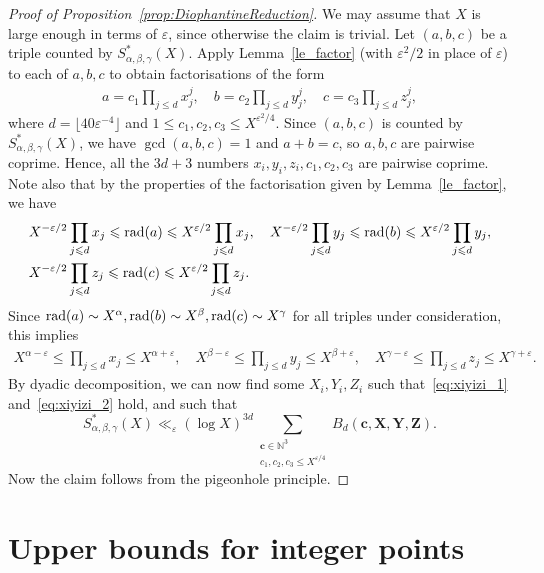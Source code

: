 \begin{proof}[Proof of Proposition~\ref{prop:DiophantineReduction}]
  We may assume that $X$ is large enough in terms of $\varepsilon$, since otherwise the claim is trivial. Let $(a,b,c)$ be a triple counted by $S^*_{\alpha,\beta,\gamma}(X)$. Apply Lemma~\ref{le_factor} (with $\varepsilon^2/2$ in place of $\varepsilon$) to each of $a,b,c$ to obtain factorisations of the form
\begin{align*}
a=c_1\prod_{j\leq d}x_j^j,\quad b=c_2\prod_{j\leq d}y_j^j,\quad c=c_3\prod_{j\leq d}z_j^j,
\end{align*}
where $d=\lfloor 40\varepsilon^{-4}\rfloor$ and $1\leq c_1,c_2,c_3\leq X^{\varepsilon^2/4}$. Since $(a,b,c)$ is counted by $S^*_{\alpha,\beta,\gamma}(X)$, we have $\gcd(a,b,c)=1$ and $a+b=c$, so $a,b,c$ are pairwise coprime. Hence, all the $3d+3$ numbers $x_i,y_i,z_i,c_1,c_2,c_3$ are pairwise coprime. Note also that by the properties of the factorisation given by Lemma~\ref{le_factor}, we have
\begin{align*}
&X^{-\varepsilon/2}\prod_{j\leqslant d}x_j\leqslant \operatorname{rad}(a)\leqslant X^{\varepsilon/2}\prod_{j\leqslant d}x_j,\quad X^{-\varepsilon/2}\prod_{j\leqslant d}y_j\leqslant \operatorname{rad}(b)\leqslant X^{\varepsilon/2}\prod_{j\leqslant d}y_j,\\
&X^{-\varepsilon/2}\prod_{j\leqslant d}z_j\leqslant \operatorname{rad}(c)\leqslant X^{\varepsilon/2}\prod_{j\leqslant d}z_j.
\end{align*}
Since $\operatorname{rad}(a)\sim X^{\alpha},\operatorname{rad}(b)\sim X^{\beta},\operatorname{rad}(c)\sim X^{\gamma}$ for all triples under consideration, this implies
\begin{align*}
X^{\alpha-\varepsilon}\leq \prod_{j\leq d}x_j\leq X^{\alpha+\varepsilon},\quad X^{\beta-\varepsilon}\leq \prod_{j\leq d}y_j\leq X^{\beta+\varepsilon},\quad X^{\gamma-\varepsilon}\leq \prod_{j\leq d}z_j\leq X^{\gamma+\varepsilon}.
\end{align*}
By dyadic decomposition, we can now find some $X_i, Y_i,Z_i$ such that~\eqref{eq:xiyizi_1}
and~\eqref{eq:xiyizi_2}
 hold, and such that
\[
S^*_{\alpha,\beta,\gamma}(X)\ll_{\varepsilon} (\log X)^{3d} \sum_{\substack{\mathbf{c}\in \mathbb{N}^3\\
c_1,c_2,c_3
\leq X^{\varepsilon/4}}}B_d(\mathbf{c},\mathbf{X},\mathbf{Y},\mathbf{Z}).
\]
Now the claim follows from the pigeonhole principle.
\end{proof}



\chapter{Upper bounds for integer points}

